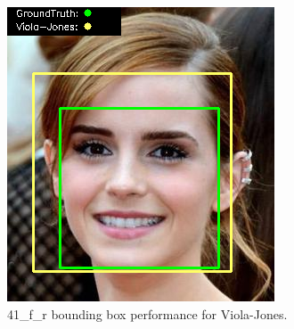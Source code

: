 \documentclass{l4proj}
\begin{document}
\begin{appendices}
\begin{figure}[h!]
\begin{minipage}{0.49\textwidth}
     \includegraphics[width=\textwidth]{images/appendix/viola/41.png}
    \caption{41\_f\_r bounding box performance for Viola-Jones.}
    \label{whoopi_result}
  \end{minipage}
\end{figure}


\end{appendices}
\end{document}
